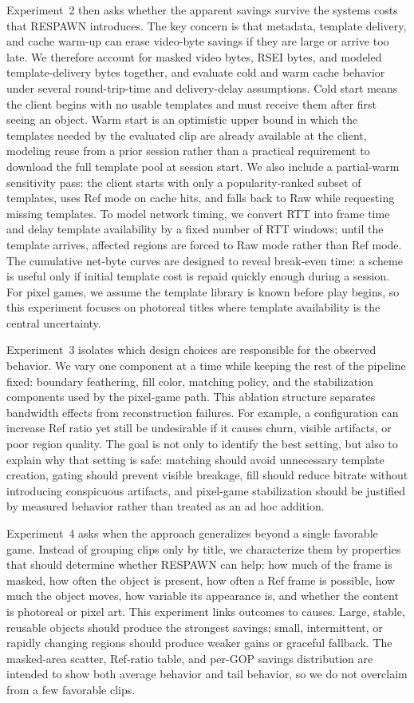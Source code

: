 Experiment~2 then asks whether the apparent savings survive the systems costs that RESPAWN introduces.
The key concern is that metadata, template delivery, and cache warm-up can erase video-byte savings if they are large or arrive too late.
We therefore account for masked video bytes, RSEI bytes, and modeled template-delivery bytes together, and evaluate cold and warm cache behavior under several round-trip-time and delivery-delay assumptions.
Cold start means the client begins with no usable templates and must receive them after first seeing an object.
Warm start is an optimistic upper bound in which the templates needed by the evaluated clip are already available at the client, modeling reuse from a prior session rather than a practical requirement to download the full template pool at session start.
We also include a partial-warm sensitivity pass: the client starts with only a popularity-ranked subset of templates, uses Ref mode on cache hits, and falls back to Raw while requesting missing templates.
To model network timing, we convert RTT into frame time and delay template availability by a fixed number of RTT windows; until the template arrives, affected regions are forced to Raw mode rather than Ref mode.
The cumulative net-byte curves are designed to reveal break-even time: a scheme is useful only if initial template cost is repaid quickly enough during a session.
For pixel games, we assume the template library is known before play begins, so this experiment focuses on photoreal titles where template availability is the central uncertainty.

Experiment~3 isolates which design choices are responsible for the observed behavior.
We vary one component at a time while keeping the rest of the pipeline fixed: boundary feathering, fill color, matching policy, and the stabilization components used by the pixel-game path.
This ablation structure separates bandwidth effects from reconstruction failures.
For example, a configuration can increase Ref ratio yet still be undesirable if it causes churn, visible artifacts, or poor region quality.
The goal is not only to identify the best setting, but also to explain why that setting is safe: matching should avoid unnecessary template creation, gating should prevent visible breakage, fill should reduce bitrate without introducing conspicuous artifacts, and pixel-game stabilization should be justified by measured behavior rather than treated as an ad hoc addition.

Experiment~4 asks when the approach generalizes beyond a single favorable game.
Instead of grouping clips only by title, we characterize them by properties that should determine whether RESPAWN can help: how much of the frame is masked, how often the object is present, how often a Ref frame is possible, how much the object moves, how variable its appearance is, and whether the content is photoreal or pixel art.
This experiment links outcomes to causes.
Large, stable, reusable objects should produce the strongest savings; small, intermittent, or rapidly changing regions should produce weaker gains or graceful fallback.
The masked-area scatter, Ref-ratio table, and per-GOP savings distribution are intended to show both average behavior and tail behavior, so we do not overclaim from a few favorable clips.

